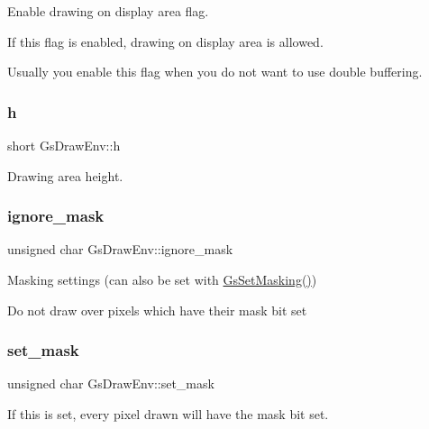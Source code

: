 Enable drawing on display area flag. 

If this flag is enabled, drawing on display area is allowed.

Usually you enable this flag when you do not want to use double buffering. \mbox{\label{structGsDrawEnv_a010f8d7cc07b6287f3b5cc33c772bbec}} 
\subsubsection{\texorpdfstring{h}{h}}
{\footnotesize\ttfamily short Gs\+Draw\+Env\+::h}



Drawing area height. 

\mbox{\label{structGsDrawEnv_a4702f6a0dc9e014fffc7c83a5d94dda2}} 
\subsubsection{\texorpdfstring{ignore\+\_\+mask}{ignore\_mask}}
{\footnotesize\ttfamily unsigned char Gs\+Draw\+Env\+::ignore\+\_\+mask}



Masking settings (can also be set with \hyperlink{psxgpu_8h_a3227c6006b054de313ff717ee00d8314}{Gs\+Set\+Masking()}) 

Do not draw over pixels which have their mask bit set \mbox{\label{structGsDrawEnv_a9c7f33c1da333d45f478dc9eb77bf0a1}} 
\subsubsection{\texorpdfstring{set\+\_\+mask}{set\_mask}}
{\footnotesize\ttfamily unsigned char Gs\+Draw\+Env\+::set\+\_\+mask}



If this is set, every pixel drawn will have the mask bit set. 

\mbox{\label{structGsDrawEnv_a1a0cd2e7dc81367a7020044f4552b3f5}} 
